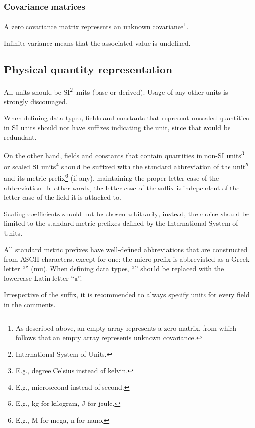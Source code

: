 \subsubsection{Covariance matrices}

A zero covariance matrix represents an unknown covariance\footnote{%
    As described above, an empty array represents a zero matrix,
    from which follows that an empty array represents unknown covariance.
}.

Infinite variance means that the associated value is undefined.

\subsection{Physical quantity representation}

All units should be SI\footnote{International System of Units.} units (base or derived).
Usage of any other units is strongly discouraged.

When defining data types, fields and constants that represent unscaled quantities in SI units
should not have suffixes indicating the unit, since that would be redundant.

On the other hand, fields and constants that contain quantities in
non-SI units\footnote{E.g., degree Celsius instead of kelvin.}
or scaled SI units\footnote{E.g., microsecond instead of second.}
should be suffixed with the standard abbreviation of the unit\footnote{E.g., kg for kilogram, J for joule.}
and its metric prefix\footnote{E.g., M for mega, n for nano.}
(if any), maintaining the proper letter case of the abbreviation.
In other words, the letter case of the suffix is independent of the letter case of the field it is attached to.

Scaling coefficients should not be chosen arbitrarily;
instead, the choice should be limited to the standard metric prefixes defined by the
International System of Units.

All standard metric prefixes have well-defined abbreviations that are constructed from ASCII characters,
except for one: the micro prefix is abbreviated as a Greek letter ``\textmu{}'' (mu).
When defining data types, ``\textmu{}'' should be replaced with the lowercase Latin letter ``u''.

Irrespective of the suffix, it is recommended to always specify units for every field in the comments.

